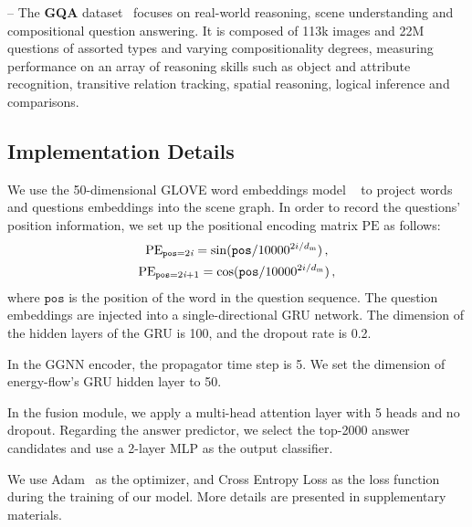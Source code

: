 \documentclass[letterpaper]{article} %
\begin{document}
\noindent --  The \textbf{GQA} dataset~\cite{DBLP:conf/cvpr/HudsonM19} focuses on real-world reasoning, scene understanding and compositional question answering. 
It is composed of 113k images and 22M questions of assorted types and varying compositionality degrees, measuring performance on an array of reasoning skills such as object and attribute recognition, transitive relation tracking, spatial reasoning, logical inference and comparisons.



\subsection{Implementation Details}
We use the 50-dimensional GLOVE word embeddings model ~\cite{pennington-etal-2014-glove} to project words and questions embeddings into the scene graph. 
In order to record the questions' position information, we set up the positional encoding matrix $\textrm{PE}$ as follows:
\begin{gather}\notag
    \textrm{PE}_{\texttt{pos}=2\emph{i}} = \sin(\texttt{pos}/10000^{2i/d_{\textrm{m}}}) \, ,\\
    \textrm{PE}_{\texttt{pos}=2\emph{i}+1} = \cos(\texttt{pos}/10000^{2i/d_{\textrm{m}}}) \, , \notag
\end{gather}
where $\texttt{pos}$ is the position of the word in the question sequence.
The question embeddings are injected into a single-directional GRU network. The dimension of the hidden layers of the GRU is 100, and the dropout rate is 0.2.

In the GGNN encoder, the propagator time step is 5. 
We set the dimension of energy-flow's GRU hidden layer to 50. 

In the fusion module, we apply a multi-head attention layer with 5 heads and no dropout. Regarding the answer predictor, we select the top-2000 answer candidates and use a 2-layer MLP as the output classifier.

We use Adam~\cite{DBLP:journals/corr/KingmaB14} as the optimizer, and Cross Entropy Loss as the loss function during the training of our model. 
More details are presented in supplementary materials.
\end{document}
